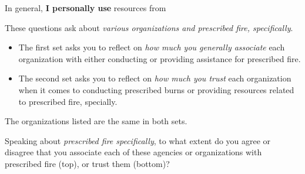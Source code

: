 \documentclass[
  english,
  ]{sdapsclassic}
\begin{document}
\begin{questionnaire}
      \begin{markgroup}{In general, \textbf{I personally use} resources from}
         {}~{}
         {}~{}
         {}~{}
         {}~{}
         {}~{}
         {}~{}
         {}~{}
         {}~{}
         {}~{}
         {}~{}
      \end{markgroup}
    
\newpage
 
These questions ask about \emph{various organizations and prescribed fire, specifically}.
\begin{itemize}
\item The first set asks you to reflect on \emph{how much you generally associate} each organization with either conducting or providing assistance for prescribed fire. 
\item The second set asks you to reflect on \emph{how much you trust} each organization when it comes to conducting prescribed burns or providing resources related to prescribed fire, specially.  
\end{itemize}
The organizations listed are the same in both sets.

 Speaking about \emph{prescribed fire specifically}, to what extent do you agree or disagree that you associate each of these agencies or organizations with prescribed fire (top), or trust them (bottom)?   
    

\end{questionnaire}
\end{document}
